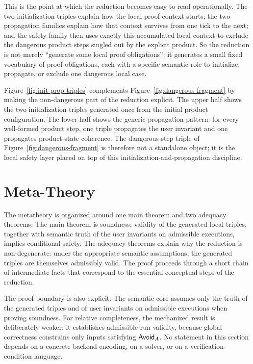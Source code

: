 \documentclass[acmsmall,screen]{acmart}
\theoremstyle{leftplain}
\theoremstyle{leftdefinition}
\theoremstyle{leftremark}
\begin{document}
This is the point at which the reduction becomes easy to read operationally.
The two initialization triples explain how the local proof context starts; the
two propagation families explain how that context survives from one tick to the
next; and the safety family then uses exactly this accumulated local context to
exclude the dangerous product steps singled out by the explicit product. So the
reduction is not merely “generate some local proof obligations”: it generates a
small fixed vocabulary of proof obligations, each with a specific semantic role
to initialize, propagate, or exclude one dangerous local case.

Figure~\ref{fig:init-prop-triples} complements
Figure~\ref{fig:dangerous-fragment} by making the non-dangerous part of the
reduction explicit. The upper half shows the two initialization triples
generated once from the initial product configuration. The lower half shows the
generic propagation pattern: for every well-formed product step, one triple
propagates the user invariant and one propagates product-state coherence. The
dangerous-step triple of Figure~\ref{fig:dangerous-fragment} is therefore not a
standalone object; it is the local safety layer placed on top of this
initialization-and-propagation discipline.

\section{Meta-Theory}\label{sec:metatheory}

The metatheory is organized around one main theorem and two adequacy
theorems. The main theorem is soundness: validity of the generated local
triples, together with semantic truth of the user invariants on admissible
executions, implies
conditional safety. The adequacy theorems explain why the
reduction is non-degenerate: under the appropriate semantic assumptions, the
generated triples are themselves admissibly valid. The proof proceeds through
a short chain of intermediate facts that correspond to the essential
conceptual steps of the reduction.

The proof boundary is also explicit. The semantic core assumes only the truth
of the generated triples and of user invariants on admissible executions when
proving soundness. For relative completeness, the mechanized result is
deliberately weaker: it establishes admissible-run validity, because global
correctness constrains only inputs satisfying $\mathsf{Avoid}_A$. No statement in this
section depends on a concrete backend encoding, on a solver, or on a
verification-condition language.
\end{document}
